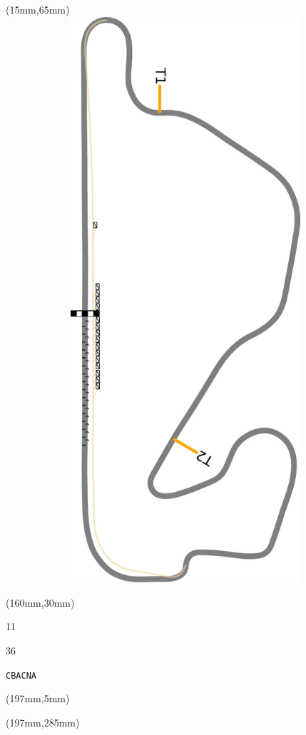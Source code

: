 \begin{textblock*}{185mm}(15mm,65mm)%
\centering
\mbox{\includegraphics[width=185mm,height=210mm,keepaspectratio]{PT/CBACNA.pdf}}
\end{textblock*}
\begin{textblock*}{40mm}(160mm,30mm)%
\Large
\par{} 
\par11 
\par36 
\par\hfill\tiny\tt CBACNA\\
\end{textblock*}
\begin{textblock*}{20mm}(197mm,5mm)%
\fbox{\thepage}
\label{CBACNA}
\end{textblock*}
\begin{textblock*}{20mm}(197mm,285mm)%
\fbox{\thepage}
\end{textblock*}

